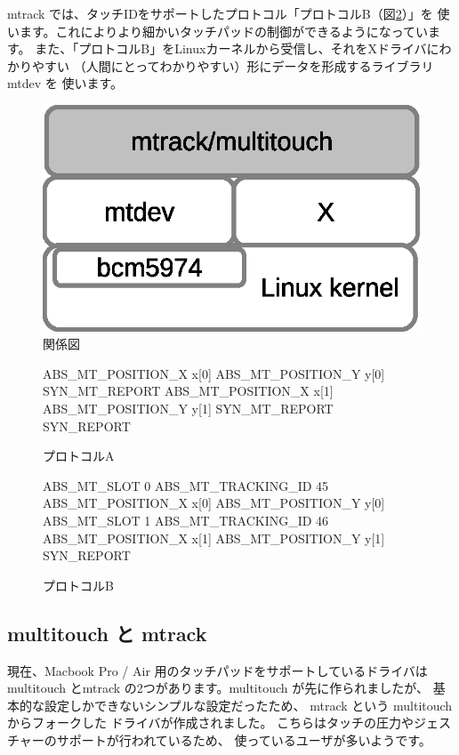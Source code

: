\documentclass[mingoth,a4paper]{jsarticle}
\begin{document}
mtrack では、タッチIDをサポートしたプロトコル「プロトコルB（図\ref{fig:protocolA}）」を
使います。これによりより細かいタッチパッドの制御ができるようになっています。
また、「プロトコルB」をLinuxカーネルから受信し、それをXドライバにわかりやすい
（人間にとってわかりやすい）形にデータを形成するライブラリ mtdev を
使います。

\begin{figure}[h]
\begin{center}
\includegraphics[width=0.3\hsize]{image201210/mtrack.eps}
\end{center}
\caption{関係図}
\label{fig:mtrack-relation}
\end{figure}

\begin{figure}[h]
\begin{commandline}
ABS_MT_POSITION_X x[0]
ABS_MT_POSITION_Y y[0]
SYN_MT_REPORT
ABS_MT_POSITION_X x[1]
ABS_MT_POSITION_Y y[1]
SYN_MT_REPORT
SYN_REPORT
\end{commandline}

\caption{プロトコルA}
\label{fig:protocolA}
\end{figure}

\begin{figure}[h]
\begin{commandline}
ABS_MT_SLOT 0
ABS_MT_TRACKING_ID 45
ABS_MT_POSITION_X x[0]
ABS_MT_POSITION_Y y[0]
ABS_MT_SLOT 1
ABS_MT_TRACKING_ID 46
ABS_MT_POSITION_X x[1]
ABS_MT_POSITION_Y y[1]
SYN_REPORT
\end{commandline}
\caption{プロトコルB}
\label{fig:protocolB}
\end{figure}

\subsection{multitouch と mtrack}

現在、Macbook Pro / Air 用のタッチパッドをサポートしているドライバは
multitouch とmtrack の2つがあります。multitouch が先に作られましたが、
基本的な設定しかできないシンプルな設定だったため、
mtrack という multitouch からフォークした 
ドライバが作成されました。
こちらはタッチの圧力やジェスチャーのサポートが行われているため、
使っているユーザが多いようです。
\end{document}
